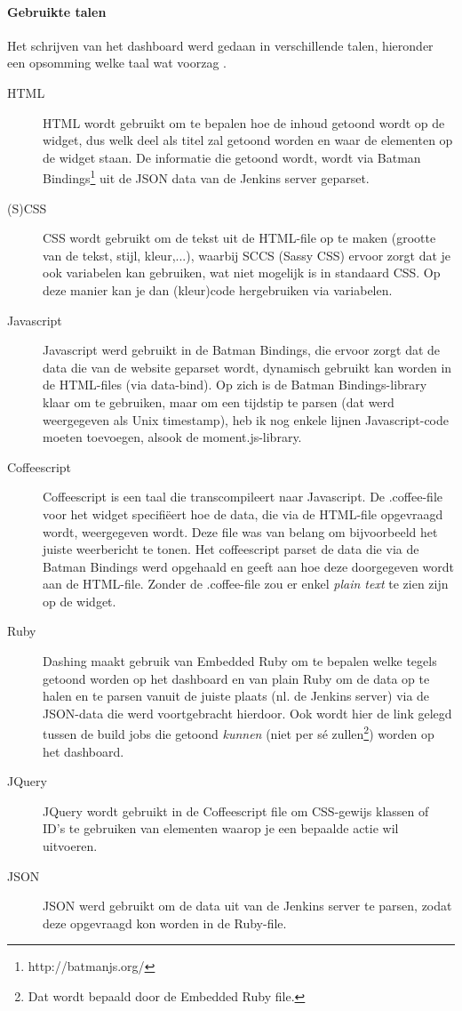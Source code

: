 \documentclass[10pt,a4paper]{article}
\begin{document}
\paragraph{Gebruikte talen}
Het schrijven van het dashboard werd gedaan in verschillende talen, hieronder een opsomming welke taal wat voorzag .
\begin{description}
\item[HTML] HTML wordt gebruikt om te bepalen hoe de inhoud getoond wordt op de widget, dus welk deel als titel zal getoond worden en waar de elementen op de widget staan. De informatie die getoond wordt, wordt via Batman Bindings\footnote{http://batmanjs.org/} uit de JSON data van de Jenkins server geparset. 
\item[(S)CSS] CSS wordt gebruikt om de tekst uit de HTML-file op te maken (grootte van de tekst, stijl, kleur,...), waarbij SCCS (Sassy CSS) ervoor zorgt dat je ook variabelen kan gebruiken, wat niet mogelijk is in standaard CSS. Op deze manier kan je dan (kleur)code hergebruiken via variabelen. 
\item[Javascript] Javascript werd gebruikt in de Batman Bindings, die ervoor zorgt dat de data die van de website geparset wordt, dynamisch gebruikt kan worden in de HTML-files (via data-bind). Op zich is de Batman Bindings-library klaar om te gebruiken, maar om een tijdstip te parsen (dat werd weergegeven als Unix timestamp), heb ik nog enkele lijnen Javascript-code moeten toevoegen, alsook de moment.js-library.
\item[Coffeescript] Coffeescript is een taal die transcompileert naar Javascript. De .coffee-file voor het widget specifi\"eert hoe de data, die via de HTML-file opgevraagd wordt, weergegeven wordt. Deze file was van belang om bijvoorbeeld het juiste weerbericht te tonen. Het coffeescript parset de data die via de Batman Bindings werd opgehaald en geeft aan hoe deze doorgegeven wordt aan de HTML-file. Zonder de .coffee-file zou er enkel \textit{plain text} te zien zijn op de widget.
\item[Ruby] Dashing maakt gebruik van Embedded Ruby om te bepalen welke tegels getoond worden op het dashboard en van plain Ruby om de data op te halen en te parsen vanuit de juiste plaats (nl. de Jenkins server) via de JSON-data die werd voortgebracht hierdoor. Ook wordt hier de link gelegd tussen de build jobs die getoond \emph{kunnen} (niet per s\'e zullen\footnote{Dat wordt bepaald door de Embedded Ruby file.}) worden op het dashboard.
\item[JQuery] JQuery wordt gebruikt in de Coffeescript file om CSS-gewijs klassen of ID's te gebruiken van elementen waarop je een bepaalde actie wil uitvoeren.
\item[JSON] JSON werd gebruikt om de data uit van de Jenkins server te parsen, zodat deze opgevraagd kon worden in de Ruby-file.
\end{description}
\end{document}
